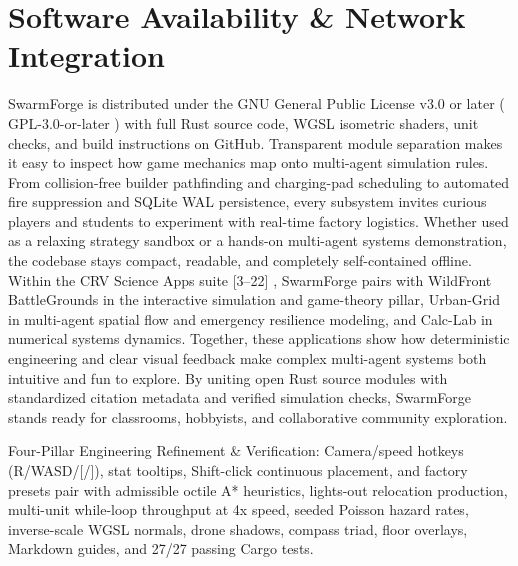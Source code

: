 \documentclass[10pt,letterpaper]{article}
\begin{document}
\section{Software Availability \& Network Integration}
SwarmForge is distributed under the GNU General Public License v3.0 or later ( GPL-3.0-or-later ) with full Rust source code, WGSL isometric shaders, unit checks, and build instructions on GitHub. Transparent module separation makes it easy to inspect how game mechanics map onto multi-agent simulation rules. From collision-free builder pathfinding and charging-pad scheduling to automated fire suppression and SQLite WAL persistence, every subsystem invites curious players and students to experiment with real-time factory logistics. Whether used as a relaxing strategy sandbox or a hands-on multi-agent systems demonstration, the codebase stays compact, readable, and completely self-contained offline. Within the CRV Science Apps suite [3--22] , SwarmForge pairs with WildFront BattleGrounds in the interactive simulation and game-theory pillar, Urban-Grid in multi-agent spatial flow and emergency resilience modeling, and Calc-Lab in numerical systems dynamics. Together, these applications show how deterministic engineering and clear visual feedback make complex multi-agent systems both intuitive and fun to explore. By uniting open Rust source modules with standardized citation metadata and verified simulation checks, SwarmForge stands ready for classrooms, hobbyists, and collaborative community exploration.

Four-Pillar Engineering Refinement \& Verification: Camera/speed hotkeys (R/WASD/[/]), stat tooltips, Shift-click continuous placement, and factory presets pair with admissible octile A* heuristics, lights-out relocation production, multi-unit while-loop throughput at 4x speed, seeded Poisson hazard rates, inverse-scale WGSL normals, drone shadows, compass triad, floor overlays, Markdown guides, and 27/27 passing Cargo tests.
\end{document}
